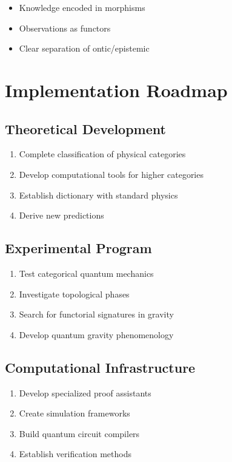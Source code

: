 \documentclass[11pt,a4paper]{article}
\begin{document}
\begin{itemize}
    \item Knowledge encoded in morphisms
    \item Observations as functors
    \item Clear separation of ontic/epistemic
\end{itemize}

\section{Implementation Roadmap}

\subsection{Theoretical Development}

\begin{enumerate}
    \item Complete classification of physical categories
    \item Develop computational tools for higher categories
    \item Establish dictionary with standard physics
    \item Derive new predictions
\end{enumerate}

\subsection{Experimental Program}

\begin{enumerate}
    \item Test categorical quantum mechanics
    \item Investigate topological phases
    \item Search for functorial signatures in gravity
    \item Develop quantum gravity phenomenology
\end{enumerate}

\subsection{Computational Infrastructure}

\begin{enumerate}
    \item Develop specialized proof assistants
    \item Create simulation frameworks
    \item Build quantum circuit compilers
    \item Establish verification methods
\end{enumerate}
\end{document}
